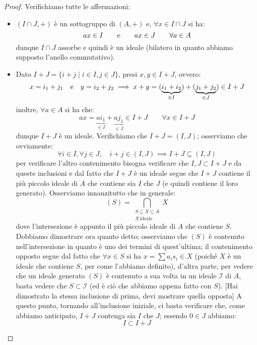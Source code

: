 \documentclass[11pt]{scrartcl}
\begin{document}
\begin{proof}
    Verifichiamo tutte le affermazioni:
    \begin{itemize}
        \item $(I \cap J,+)$ è un sottogruppo di $(A,+)$ e, $\forall x \in I \cap J$ si ha:
            \[ ax \in I \qquad \text e \qquad ax \in J \qquad \forall a \in A
                \]
            dunque $I \cap J$ assorbe e quindi è un ideale (bilatero in quanto abbiamo supposto l'anello commutativo).
        \item Dato $I + J = \{i + j \mid i \in I, j \in J\}$, presi $x,y \in I + J$, ovvero:
            \[ x = i_1 + j_1 \quad \text e \quad y = i_2 + j_2 \implies x + y = (\underbrace{i_1 + i_2}_{\in I}) + (\underbrace{j_1 + j_2}_{\in J}) \in I + J
                \]
            inoltre, $\forall a \in A$ si ha che:
            \[ ax = \underbrace{ai_1}_{\in I} + \underbrace{aj_1}_{\in J} \in I + J \qquad \forall x \in I + J
                \]
            dunque $I+J$ è un ideale. Verifichiamo che $I+J = (I,J)$; osserviamo che ovviamente:
            \[ \forall i \in I, \forall j \in J, \quad i+j \in (I,J) \implies I + J \subseteq (I,J)
                \]
            per verificare l'altro contenimento bisogna verificare che $I,J \subset I + J$ e da queste inclusioni e dal fatto che $I + J$ è un ideale segue che
            $I + J$ contiene il più piccolo ideale di $A$ che contiene sia $I$ che $J$ (e quindi contiene il loro generato). Osserviamo innanzitutto che in generale:
                \[ (S) = \bigcap_{\substack{S \subseteq X \subseteq A\\ X\,\text{ideale}}} X
                    \]
            dove l'intersezione è appunto il più piccolo ideale di $A$ che contiene $S$.
            Dobbiamo dimostrare ora quanto detto; osserviamo che $(S)$ è contenuto nell'intersezione in quanto
            è uno dei termini di quest'ultima; il contenimento opposto segue dal fatto che $\forall x \in S$ si ha $x = \sum a_is_i \in X$ (poiché $X$ è un ideale che contiene $S$, per come l'abbiamo definito),
            d'altra parte, per vedere che un ideale generato $(S)$ è contenuto a sua volta in un ideale $\mathcal{I}$ di $A$, basta vedere che $S \subset \mathcal{I}$ (ed è ciò che abbiamo appena fatto con $S$). [Hai dimostrato la stessa inclusione di prima, devi mostrare quella opposta]
            A questo punto, tornando all'inclusione iniziale, ci basta verificare che, come abbiamo anticipato, $I+J$ contenga sia $I$ che $J$; essendo $0 \in J$ abbiamo:
                \[ I \subset I + J
                    \]

\end{itemize}
\end{proof}
\end{document}
